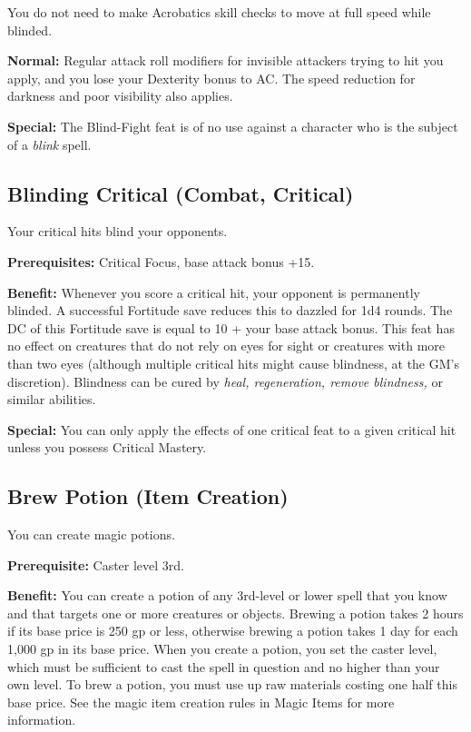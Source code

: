 You do not need to make Acrobatics skill checks to move at full speed while blinded.
				
\textbf{Normal:} Regular attack roll modifiers for invisible attackers trying to hit you apply, and you lose your Dexterity bonus to AC. The speed reduction for darkness and poor visibility also applies.
				
\textbf{Special:} The Blind-Fight feat is of no use against a character who is the subject of a \textit{blink }spell.
				
\subsection{Blinding Critical (Combat, Critical)}

				
Your critical hits blind your opponents.
				
\textbf{Prerequisites:} Critical Focus, base attack bonus +15.
				
\textbf{Benefit:} Whenever you score a critical hit, your opponent is permanently blinded. A successful Fortitude save reduces this to dazzled for 1d4 rounds. The DC of this Fortitude save is equal to 10 + your base attack bonus. This feat has no effect on creatures that do not rely on eyes for sight or creatures with more than two eyes (although multiple critical hits might cause blindness, at the GM's discretion). Blindness can be cured by \textit{heal, regeneration, remove blindness, }or similar abilities.
				
\textbf{Special:} You can only apply the effects of one critical feat to a given critical hit unless you possess Critical Mastery.
				
\subsection{Brew Potion (Item Creation)}

				
You can create magic potions.
				
\textbf{Prerequisite:} Caster level 3rd.
				
\textbf{Benefit:} You can create a potion of any 3rd-level or lower spell that you know and that targets one or more creatures or objects. Brewing a potion takes 2 hours if its base price is 250 gp or less, otherwise brewing a potion takes 1 day for each 1,000 gp in its base price. When you create a potion, you set the caster level, which must be sufficient to cast the spell in question and no higher than your own level. To brew a potion, you must use up raw materials costing one half this base price. See the magic item creation rules in Magic Items for more information.

